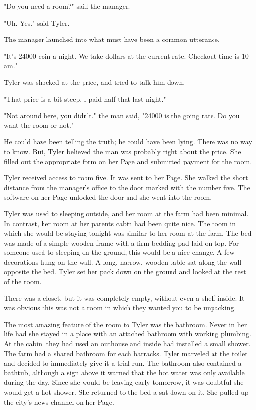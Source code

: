 \documentclass[courier]{sffms}
\begin{document}
"Do you need a room?" said the manager.

"Uh. Yes." said Tyler.

The manager launched into what must have been
a common utterance.

"It's 24000 coin a night. We take dollars at the current
rate. Checkout time is 10 am."

Tyler was shocked at the price, and tried to talk him
down.

"That price is a bit steep. I paid half that last night."

"Not around here, you didn't." the man said, "24000
is the going rate. Do you want the room or not."

He could have been telling the truth; he could have
been lying. There was no way to know. But,
Tyler believed the man was probably right about the
price. She filled out the appropriate form
on her Page and submitted payment for the room.

Tyler received access to room five. It was sent to
her Page. She walked the short distance from the
manager's office to the door marked with the
number five. The software on her Page unlocked
the door and she went into the room.

Tyler was used to sleeping outside, and her room
at the farm had been minimal. In contrast, her
room at her parents cabin had been quite nice.
The room in which she would be staying tonight
was similar to her room at the farm. The bed was
made of a simple wooden frame with a firm
bedding pad laid on top. For someone used to
sleeping on the ground, this would be a nice
change. A few decorations hung on the wall.
A long, narrow, wooden table sat along the wall
opposite the bed. Tyler set her pack down on the
ground and looked at the rest of the room.

There was a closet, but it was completely empty,
without even a shelf inside. It was obvious this
was not a room in which they wanted you to
be unpacking.

The most amazing feature of the room to Tyler
was the bathroom. Never in her life had she
stayed in a place with an attached bathroom with
working plumbing. At the cabin, they had used an
outhouse and inside had installed a small shower.
The farm had a shared bathroom for each
barracks. Tyler marveled at the toilet and decided
to immediately give it a trial run. The bathroom
also contained a bathtub, although a sign
above it warned that the hot water was only
available during the day. Since she would be
leaving early tomorrow, it was doubtful she
would get a hot shower. She returned to the
bed a sat down on it. She pulled up the city's
news channel on her Page.
\end{document}
